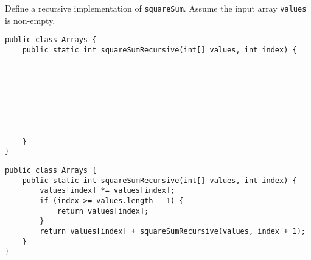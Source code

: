 \question Define a recursive implementation of \texttt{squareSum}. Assume the input array \texttt{values} is non-empty.

\ifprintanswers\else
\begin{lstlisting}
public class Arrays {
    public static int squareSumRecursive(int[] values, int index) {








    }
}
\end{lstlisting}
\fi

\begin{solution}
\begin{lstlisting}
public class Arrays {
    public static int squareSumRecursive(int[] values, int index) {
        values[index] *= values[index];
        if (index >= values.length - 1) {
            return values[index];
        }
        return values[index] + squareSumRecursive(values, index + 1);
    }
}
\end{lstlisting}
\end{solution}